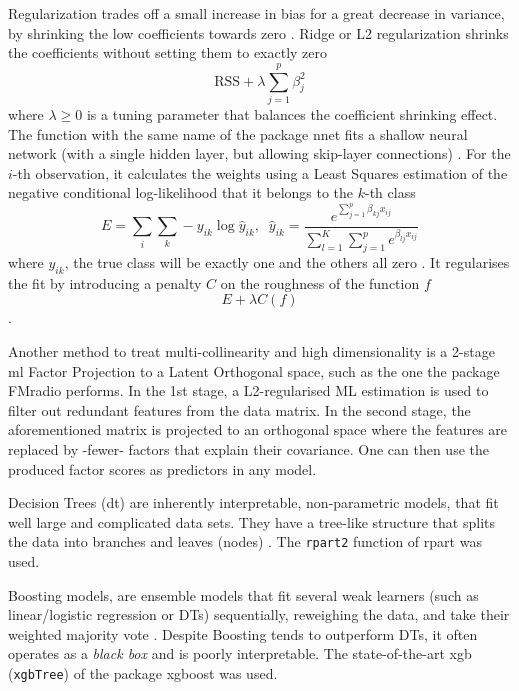 \documentclass{amsart}
\begin{document}
Regularization trades off a small increase in bias for a great decrease in variance, by shrinking the low coefficients towards zero \cite{James2023AnEdition}. Ridge or L2 regularization \cite{Cessie1992RidgeRegression} shrinks the coefficients without setting them to exactly zero \cite{Cessie1992RidgeRegression}
\[\textrm{RSS} + \lambda\sum_{j=1}^{p}\beta_j^2 \]where $\lambda \geq 0$ is a tuning parameter that balances the coefficient shrinking effect. The function with the same name of the package \textsf{nnet} fits a shallow neural network (with a single hidden layer, but allowing skip-layer connections) \cite{nnet}. For the $i$-th observation, it calculates the weights using a Least Squares estimation of the negative conditional log-likelihood that it belongs to the $k$-th class
\[E = \sum_{i}\sum_{k}-y_{ik}\log\hat{y}_{ik}, \; \;  \hat{y}_{ik} =  \dfrac{e^{\sum_{j=1}^{p}\beta_{kj}x_{ij}}}{\sum_{l=1}^{K}\sum_{j=1}^{p}e^{\beta_{lj}x_{ij}}}\]
where $y_{ik}$, the true class will be exactly one and the others all zero \cite{nnet}. It regularises the fit by introducing a penalty $C$ on the roughness of the function $f$
 \[E + \lambda C(f)\].

Another method to treat multi-collinearity and high dimensionality is a 2-stage \acrfull{ml} Factor Projection to a Latent Orthogonal space, such as the one the package \textsf{FMradio} \cite{Peeters2019StableData} performs. In the 1st stage, a L2-regularised ML estimation is used to filter out redundant features from the data matrix. In the second stage, the aforementioned matrix is projected to an orthogonal space where the features are replaced by -fewer- factors that explain their covariance. One can then use the produced factor scores as predictors in any model.

Decision Trees (\acrshort{dt}) are inherently interpretable, non-parametric models, that fit well large and complicated data sets. They have a tree-like structure that splits the data into branches and leaves (nodes) \cite{Song2015DecisionPrediction}. The \texttt{rpart2} \cite{rpart} function of \textsf{rpart} was used.

Boosting models, are ensemble models that fit several weak learners (such as linear/logistic regression or DTs) sequentially, reweighing the data, and take their weighted majority vote \cite{Friedman2000boosting,Friedman2001gbm}. Despite Boosting tends to outperform DTs, it often operates as a \textit{black box} and is poorly interpretable. The state-of-the-art \acrlong{xgb} (\texttt{xgbTree}) of the package \textsf{xgboost} \cite{Chen2016XGBoost:System} was used.
\end{document}
